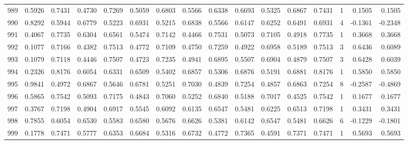 \begin{tabular}{lrrrrrrrrrrrrrrr}
989 &      0.5926 &  0.7431 &  0.4730 &  0.7269 &  0.5059 &  0.6803 &  0.5566 &  0.6338 &  0.6693 &  0.5325 &   0.6867 &     0.7431 &      1 &                    0.1505 &                     0.1505 \\
990 &      0.8292 &  0.5944 &  0.6779 &  0.5223 &  0.6931 &  0.5215 &  0.6838 &  0.5566 &  0.6147 &  0.6252 &   0.6491 &     0.6931 &      4 &                   -0.1361 &                    -0.2348 \\
991 &      0.4067 &  0.7735 &  0.6304 &  0.6561 &  0.5474 &  0.7142 &  0.4466 &  0.7531 &  0.5073 &  0.7105 &   0.4918 &     0.7735 &      1 &                    0.3668 &                     0.3668 \\
992 &      0.1077 &  0.7166 &  0.4382 &  0.7513 &  0.4772 &  0.7109 &  0.4750 &  0.7259 &  0.4922 &  0.6958 &   0.5189 &     0.7513 &      3 &                    0.6436 &                     0.6089 \\
993 &      0.1079 &  0.7118 &  0.4446 &  0.7507 &  0.4723 &  0.7235 &  0.4941 &  0.6895 &  0.5507 &  0.6904 &   0.4879 &     0.7507 &      3 &                    0.6428 &                     0.6039 \\
994 &      0.2326 &  0.8176 &  0.6054 &  0.6331 &  0.6509 &  0.5402 &  0.6857 &  0.5306 &  0.6876 &  0.5191 &   0.6881 &     0.8176 &      1 &                    0.5850 &                     0.5850 \\
995 &      0.9841 &  0.4972 &  0.6867 &  0.5646 &  0.6781 &  0.5251 &  0.7030 &  0.4839 &  0.7254 &  0.4857 &   0.6863 &     0.7254 &      8 &                   -0.2587 &                    -0.4869 \\
996 &      0.5865 &  0.7542 &  0.5093 &  0.7175 &  0.4843 &  0.7060 &  0.5252 &  0.6840 &  0.5188 &  0.7017 &   0.4525 &     0.7542 &      1 &                    0.1677 &                     0.1677 \\
997 &      0.3767 &  0.7198 &  0.4904 &  0.6917 &  0.5545 &  0.6092 &  0.6135 &  0.6547 &  0.5481 &  0.6225 &   0.6513 &     0.7198 &      1 &                    0.3431 &                     0.3431 \\
998 &      0.7855 &  0.6054 &  0.6530 &  0.5583 &  0.6580 &  0.5676 &  0.6626 &  0.5381 &  0.6142 &  0.6547 &   0.5481 &     0.6626 &      6 &                   -0.1229 &                    -0.1801 \\
999 &      0.1778 &  0.7471 &  0.5777 &  0.6353 &  0.6684 &  0.5316 &  0.6732 &  0.4772 &  0.7365 &  0.4591 &   0.7371 &     0.7471 &      1 &                    0.5693 &                     0.5693 \\
\bottomrule
\end{tabular}
